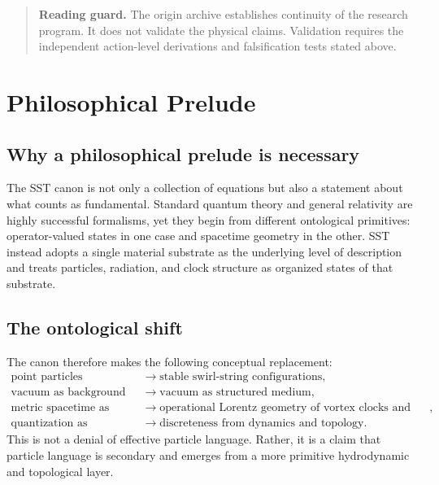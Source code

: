 \documentclass[11pt]{article}
\theoremstyle{definition}
\theoremstyle{plain}
\theoremstyle{remark}
\begin{document}
\begin{quote}
\small
\textbf{Reading guard.}
The origin archive establishes continuity of the research program. It does not
validate the physical claims. Validation requires the independent action-level
derivations and falsification tests stated above.
\end{quote}



    \section{Philosophical Prelude}
        \label{sec:philosophy}

    \subsection{Why a philosophical prelude is necessary}
        The SST canon is not only a collection of equations but also a statement about what counts as fundamental. Standard quantum theory and general relativity are highly successful formalisms, yet they begin from different ontological primitives: operator-valued states in one case and spacetime geometry in the other. SST instead adopts a single material substrate as the underlying level of description and treats particles, radiation, and clock structure as organized states of that substrate.

    \subsection{The ontological shift}
        The canon therefore makes the following conceptual replacement:
        \begin{align}
            \text{point particles} &\longrightarrow \text{stable swirl-string configurations}, \\
            \text{vacuum as background} &\longrightarrow \text{vacuum as structured medium}, \\
            \text{metric spacetime as primitive} &\longrightarrow \text{operational Lorentz geometry of vortex clocks and torsion pulses}, \\
            \text{quantization as postulate} &\longrightarrow \text{discreteness from dynamics and topology}.
        \end{align}
        This is not a denial of effective particle language. Rather, it is a claim that particle language is secondary and emerges from a more primitive hydrodynamic and topological layer.
\end{document}
